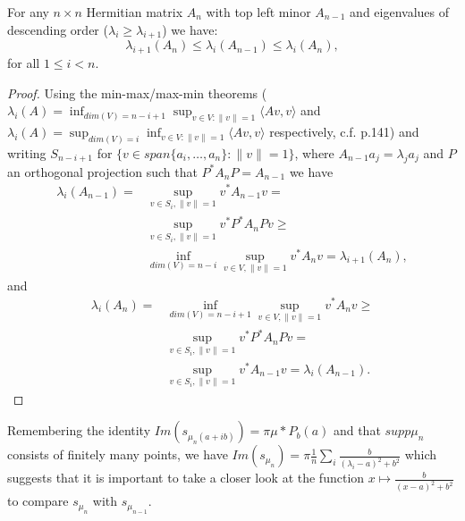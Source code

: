 \begin{theorem}
	For any $n\times n$ Hermitian matrix $A_n$ with top left minor $A_{n-1}$ and eigenvalues of descending order ($\lambda_i\geq\lambda_{i+1}$) we have:
	\begin{equation*}
		\lambda_{i+1}(A_n)\leq\lambda_i(A_{n-1})\leq\lambda_i(A_n), 
	\end{equation*}
	for all $1\leq i < n$.
\end{theorem}
\begin{proof}
Using the min-max/max-min theorems \newline($\lambda_i(A)=\inf_{dim(V)=n-i+1}\sup_{v\in V : \|v\|=1}\langle Av,v\rangle$ and \newline$\lambda_i(A)=\sup_{dim(V)=i}\inf_{v\in V : \|v\|=1}\langle Av,v\rangle$ respectively, c.f. \cite{TeschlQM} p.141) and writing $S_{n-i+1}$ for $\{v\in span\{a_i,\dots,a_n\}: \|v\|=1\}$, where $A_{n-1}a_j=\lambda_j a_j$ and $P$ an orthogonal projection such that $P^*A_nP=A_{n-1}$ we have
	\begin{align*}
		\lambda_i(A_{n-1}) =
		&\sup_{v\in S_i,\|v\|=1}v^*A_{n-1}v =\\
		&\sup_{v\in S_i,\|v\|=1}v^*P^*A_nPv\geq\\
		&\inf_{dim(V)=n-i}\sup_{v\in V,\|v\|=1}v^*A_nv =
		\lambda_{i+1}(A_n),
	\end{align*}
	and
	\begin{align*}
		\lambda_i(A_n) =
		&\inf_{dim(V)=n-i+1}\sup_{v\in V,\|v\|=1}v^*A_nv \geq\\
		&\sup_{v\in S_i,\|v\|=1}v^*P^*A_nPv =\\
		&\sup_{v\in S_i,\|v\|=1}v^*A_{n-1}v =
		\lambda_i(A_{n-1}).%
	\end{align*}
\end{proof}

Remembering the identity $Im(s_{\mu_n(a+ib)})=\pi\mu*P_b(a)$ and that $supp\mu_n$ consists of finitely many points, we have $Im(s_{\mu_n})=\pi\frac{1}{n}\sum_i\frac{b}{(\lambda_i-a)^2+b^2}$ which suggests that it is important to take a closer look at the function $x\mapsto\frac{b}{(x-a)^2+b^2}$ to compare $s_{\mu_n}$ with $s_{\mu_{n-1}}$.

